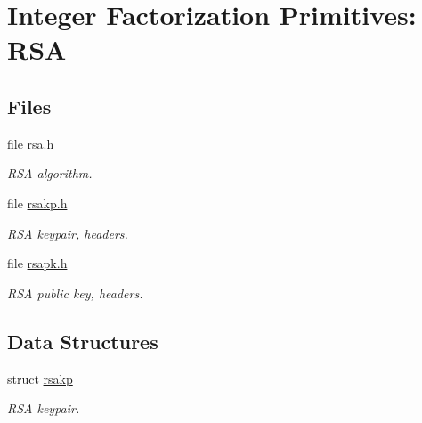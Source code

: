 \hypertarget{group__IF__rsa__m}{
\section{Integer Factorization Primitives: RSA}
\label{group__IF__rsa__m}
}
\subsection*{Files}
\begin{CompactItemize}
\item 
file \hyperlink{rsa_8h}{rsa.h}
\begin{CompactList}\small\item\em RSA algorithm. \item\end{CompactList}

\item 
file \hyperlink{rsakp_8h}{rsakp.h}
\begin{CompactList}\small\item\em RSA keypair, headers. \item\end{CompactList}

\item 
file \hyperlink{rsapk_8h}{rsapk.h}
\begin{CompactList}\small\item\em RSA public key, headers. \item\end{CompactList}

\end{CompactItemize}
\subsection*{Data Structures}
\begin{CompactItemize}
\item 
struct \hyperlink{structrsakp}{rsakp}
\begin{CompactList}\small\item\em RSA keypair. \item\end{CompactList}\end{CompactItemize}
